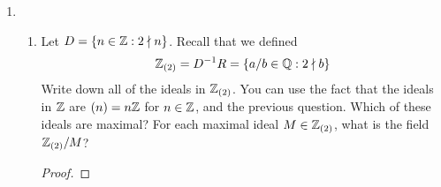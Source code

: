 \documentclass[../psets.tex]{subfiles}
\begin{document}
\begin{enumerate}
\begin{enumerate}[label={(\alph*)}]
\begin{proof}
            \par
            Let $J\in D^{-1}R$ be an arbitrary ideal. Per part (e), there exists an ideal $I\subset R$ such that $J=I^e$. Since $R$ is a PID, $I=Ra$ for some $a\in I$. Additionally, as per the definition of the extension map, $a=a/1\in I^e=J$. We will now prove that $I^e=D^{-1}Ra$. By definition, $D^{-1}Ra\subset I^e$. In the other direction, let $x/s\in I^e$ be arbitrary. Since $x\in I$, $x=ab$ for some $b\in R$. Moreover, $b/s\in D^{-1}R$, so $x/s=(b/s)\cdot a\in D^{-1}Ra$, as desired.
        \end{proof}
    \end{enumerate}
    \item 
    \begin{enumerate}[label={(\alph*)}]
        \item Let $D=\{n\in\mathbb{Z}:2\nmid n\}$. Recall that we defined
        \begin{equation*}
            \mathbb{Z}_{(2)} = D^{-1}R
            = \{a/b\in\mathbb{Q}:2\nmid b\}
        \end{equation*}
        Write down all of the ideals in $\mathbb{Z}_{(2)}$. You can use the fact that the ideals in $\mathbb{Z}$ are $(n)=n\mathbb{Z}$ for $n\in\mathbb{Z}$, and the previous question. Which of these ideals are maximal? For each maximal ideal $M\in\mathbb{Z}_{(2)}$, what is the field $\mathbb{Z}_{(2)}/M$?
        \begin{proof}

            
            



\end{proof}
\end{enumerate}
\end{enumerate}
\end{document}
